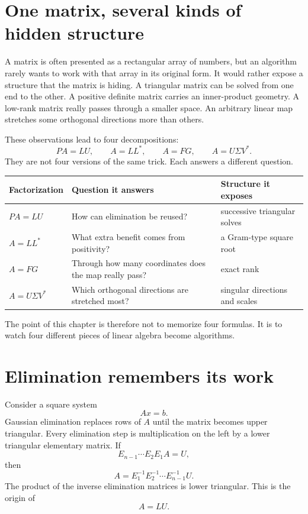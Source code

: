
\section{One matrix, several kinds of hidden structure}

A matrix is often presented as a rectangular array of numbers, but an algorithm rarely wants to work with that array in its original form.  It would rather expose a structure that the matrix is hiding.  A triangular matrix can be solved from one end to the other.  A positive definite matrix carries an inner-product geometry.  A low-rank matrix really passes through a smaller space.  An arbitrary linear map stretches some orthogonal directions more than others.

These observations lead to four decompositions:
\[
  PA=LU,
  \qquad
  A=LL^*,
  \qquad
  A=FG,
  \qquad
  A=U\Sigma V^*.
\]
They are not four versions of the same trick.  Each answers a different question.

\begin{center}
\small
\begin{tabularx}{\textwidth}{@{}lYY@{}}
\toprule
Factorization & Question it answers & Structure it exposes\\
\midrule
\(PA=LU\) & How can elimination be reused? & successive triangular solves\\
\(A=LL^*\) & What extra benefit comes from positivity? & a Gram-type square root\\
\(A=FG\) & Through how many coordinates does the map really pass? & exact rank\\
\(A=U\Sigma V^*\) & Which orthogonal directions are stretched most? & singular directions and scales\\
\bottomrule
\end{tabularx}
\end{center}

The point of this chapter is therefore not to memorize four formulas.  It is to watch four different pieces of linear algebra become algorithms.

\section{Elimination remembers its work}

Consider a square system
\[
  Ax=b.
\]
Gaussian elimination replaces rows of \(A\) until the matrix becomes upper triangular.  Every elimination step is multiplication on the left by a lower triangular elementary matrix.  If
\[
  E_{n-1}\cdots E_2E_1A=U,
\]
then
\[
  A=E_1^{-1}E_2^{-1}\cdots E_{n-1}^{-1}U.
\]
The product of the inverse elimination matrices is lower triangular.  This is the origin of
\[
  A=LU.
\]

